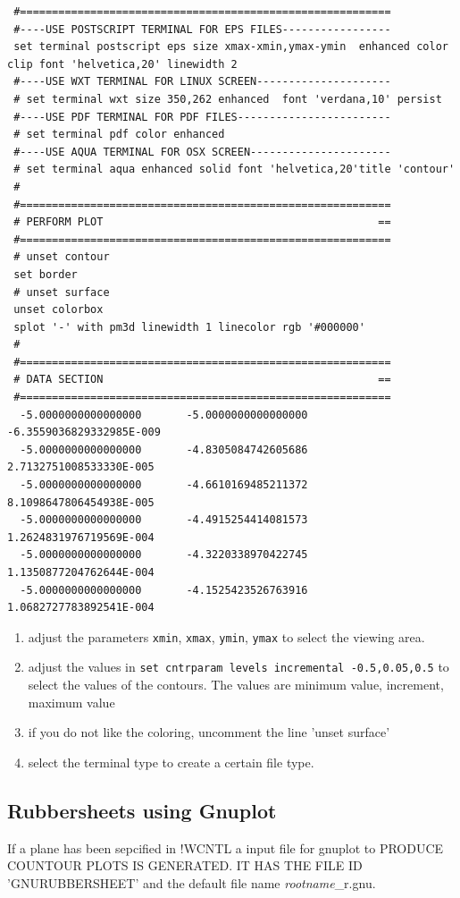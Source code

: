 \documentclass[final,12pt,makeidx,DIV=calc]{article}
\begin{document}
{{{{{{{\begin{verbatim}
 #==========================================================
 #----USE POSTSCRIPT TERMINAL FOR EPS FILES-----------------
 set terminal postscript eps size xmax-xmin,ymax-ymin  enhanced color clip font 'helvetica,20' linewidth 2 
 #----USE WXT TERMINAL FOR LINUX SCREEN---------------------
 # set terminal wxt size 350,262 enhanced  font 'verdana,10' persist 
 #----USE PDF TERMINAL FOR PDF FILES------------------------
 # set terminal pdf color enhanced 
 #----USE AQUA TERMINAL FOR OSX SCREEN----------------------
 # set terminal aqua enhanced solid font 'helvetica,20'title 'contour'
 #
 #==========================================================
 # PERFORM PLOT                                           ==
 #==========================================================
 # unset contour
 set border
 # unset surface
 unset colorbox
 splot '-' with pm3d linewidth 1 linecolor rgb '#000000'
 #
 #==========================================================
 # DATA SECTION                                           ==
 #==========================================================
  -5.0000000000000000       -5.0000000000000000       -6.3559036829332985E-009
  -5.0000000000000000       -4.8305084742605686        2.7132751008533330E-005
  -5.0000000000000000       -4.6610169485211372        8.1098647806454938E-005
  -5.0000000000000000       -4.4915254414081573        1.2624831976719569E-004
  -5.0000000000000000       -4.3220338970422745        1.1350877204762644E-004
  -5.0000000000000000       -4.1525423526763916        1.0682727783892541E-004
 \end{verbatim}}

\begin{enumerate}
\item adjust the parameters \verb|xmin|, \verb|xmax|, \verb|ymin|,
 \verb|ymax| to select the viewing area.
\item adjust the values in
 \verb|set cntrparam levels incremental -0.5,0.05,0.5| to select the
 values of the contours. The values are minimum value, increment,
 maximum value
\item if you do not like the coloring, uncomment the line 'unset surface'
\item select the terminal type to create a certain file type.
\end{enumerate}
\newpage
\subsection{Rubbersheets  using Gnuplot}
If a plane has been sepcified in !WCNTL a input file for gnuplot to
PRODUCE COUNTOUR PLOTS IS GENERATED. IT HAS THE FILE ID 'GNURUBBERSHEET'
and the default file name \textit{rootname}\_r.gnu.

}}}}}}
\end{document}
